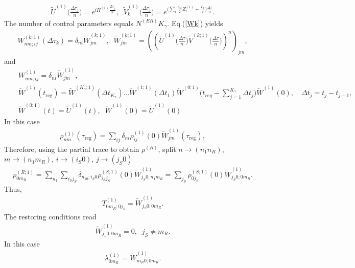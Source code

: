 \documentclass[pra,preprint,showpacs]{revtex4-1}
\begin{document}
{%
\begin{eqnarray}
\tilde U^{(1)}\Big(\frac{\Delta \tau_j}{n}\Big) = e^{ i H^{(1)}\frac{\Delta \tau_j}{n}},\;\;
\tilde V^{(1)}_k\Big(\frac{\Delta \tau_j}{n}\Big) = e^{\Big(\sum_l \frac{a_{lk}}{2}    Z^{(1)}_l  +\frac{\Gamma_k}{4}\Big)    \frac{\Delta \tau}{n}} .
\end{eqnarray}
The number of control parameters equals $N^{(ER)} K_\gamma$.
Eq.(\ref{Wk}) yields
\begin{eqnarray}\label{Wk2}
W^{(k;1)}_{nm;ij}(\Delta\tau_k) =\delta_{ni} \tilde W^{(k;1)}_{jm},\;\;
 \tilde W^{(k;1)}_{jm}=\left(\left(\tilde U^{(1)}\Big(\frac{\Delta \tau}{n}\Big) \tilde V^{(k;1)}\Big(\frac{\Delta \tau}{n}\Big)\right)^n\right)_{jm} ,
\end{eqnarray}
and
\begin{eqnarray}\label{UtK2}
&&
W^{(1)}_{nm;ij} = \delta_{ni}  \tilde W^{(1)}_{jm},\\\nonumber
&&
 \tilde W^{(1)}(t_{\mathrm{reg}})=  \tilde W^{(K_\gamma;1)}(\Delta t_{K_\gamma})\dots \tilde W^{(1;1)} (\Delta t_1) \tilde W^{(0;1)}\Big(t_{reg} - \sum_{j=1}^{K_\gamma} \Delta t_j\Big) \tilde W^{(1)}(0),\quad  \Delta t_j = t_j -t_{j-1},\\\nonumber
&&
 \tilde W^{(0;1)}(t)= \tilde U^{(1)}(t),\;\; \tilde W^{(1)}(0) = \tilde U^{(1)}(0)
\end{eqnarray}
In this case
\begin{eqnarray}
\rho^{(1)}_{nm}(\tau_{\mathrm{reg}}) = \sum_{ij} \delta_{ni}\rho^{(1)}_{ij}(0) \tilde W^{(1)}_{jm}(\tau_{\mathrm{reg}}) ,
\end{eqnarray}
Therefore, using the partial trace to obtain $\rho^{(R)}$, split $n\to (n_1 n_R)$, $m\to (n_1 m_R)$, $i\to (i_S 0)$,  $j\to (j_S 0)$
\begin{eqnarray}
\rho^{(R;1)}_{0m_R} =\sum_{n_1} \sum_{i_Sj_S} \delta_{n_10;i_S0}\rho^{(S;1)}_{i_Sj_S}(0) \tilde W^{(1)}_{j_S0;n_1m_R} =\sum_{j_S}\rho^{(S;1)}_{0j_S}(0) \tilde W^{(1)}_{j_S0;0m_R} .
\end{eqnarray}
Thus,
\begin{eqnarray}
T^{(1)}_{0m_R;0j_S} = \tilde W^{(1)}_{j_S0;0m_R}.
\end{eqnarray}
The restoring conditions read
\begin{eqnarray}
\tilde W^{(1)}_{j_S0;0m_R}=0, \;\;j_S\neq m_R .
\end{eqnarray}
In this case
\begin{eqnarray}
\lambda^{(1)}_{0m_R} =\tilde W^{(1)}_{m_R0;0m_R}.
\end{eqnarray}

}
\end{document}
